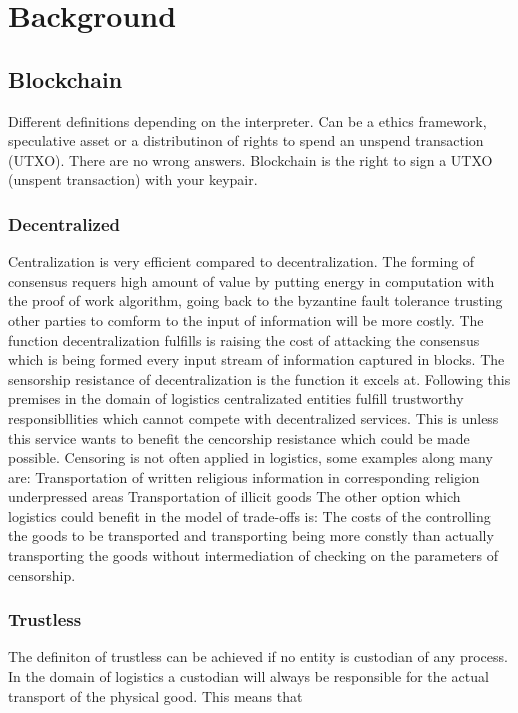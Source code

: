 \documentclass[Nomencl]{DylanMaster}
\begin{document}
\section{Background}

\subsection{Blockchain}

Different definitions depending on the interpreter. Can be a ethics framework, speculative asset or a distributinon of rights to spend an unspend transaction (UTXO). There are no wrong answers.
Blockchain is the right to sign a UTXO (unspent transaction) with your keypair.

\subsubsection{Decentralized}

Centralization is very efficient compared to decentralization. The forming of consensus requers high amount of value by putting energy in computation with the proof of work algorithm, going back to the byzantine fault tolerance trusting other parties to comform to the input of information will be more costly. The function decentralization fulfills is raising the cost of attacking the consensus which is being formed every input stream of information captured in blocks. The sensorship resistance of decentralization is the function it excels at.
Following this premises in the domain of logistics centralizated entities fulfill trustworthy responsibllities which cannot compete with decentralized services. This is unless this service wants to benefit the cencorship resistance which could be made possible. Censoring is not often applied in logistics, some examples along many are:
Transportation of written religious information in corresponding religion underpressed areas
Transportation of illicit goods
The other option which logistics could benefit in the model of trade-offs is:
The costs of the controlling the goods to be transported and transporting being more constly than actually transporting the goods without intermediation of checking on the parameters of censorship.

\subsubsection{Trustless}

The definiton of trustless can be achieved if no entity is custodian of any process. In the domain of logistics a custodian will always be responsible for the actual transport of the physical good. This means that
\end{document}
